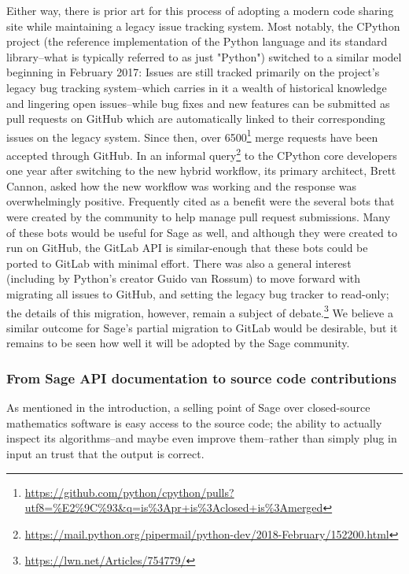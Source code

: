 {

Either way, there is prior art for this process of adopting a modern code
sharing site while maintaining a legacy issue tracking system.  Most notably,
the CPython project (the reference implementation of the Python language and
its standard library--what is typically referred to as just "Python") switched
to a similar model beginning in February 2017: Issues are still tracked
primarily on the project's legacy bug tracking system--which carries in it a
wealth of historical knowledge and lingering open issues--while bug fixes and
new features can be submitted as pull requests on GitHub which are
automatically linked to their corresponding issues on the legacy system.  Since
then, over
6500\footnote{\url{https://github.com/python/cpython/pulls?utf8=\%E2\%9C\%93\&q=is\%3Apr+is\%3Aclosed+is\%3Amerged}}
merge requests have been accepted through GitHub.  In an informal
query\footnote{\url{https://mail.python.org/pipermail/python-dev/2018-February/152200.html}}
to the CPython core developers one year after switching to the new hybrid
workflow, its primary architect, Brett Cannon, asked how the new workflow was
working and the response was overwhelmingly positive.  Frequently cited as a
benefit were the several bots that were created by the community to help manage
pull request submissions.  Many of these bots would be useful for Sage as well,
and although they were created to run on GitHub, the GitLab API is
similar-enough that these bots could be ported to GitLab with minimal effort.
There was also a general interest (including by Python's creator Guido van
Rossum) to move forward with migrating all issues to GitHub, and setting the
legacy bug tracker to read-only; the details of this migration, however, remain
a subject of debate.\footnote{\url{https://lwn.net/Articles/754779/}}  We
believe a similar outcome for Sage's partial migration to GitLab would be
desirable, but it remains to be seen how well it will be adopted by the Sage
community.


\hypertarget{source-in-documentation}{%
\subsubsection{From Sage API documentation to source code contributions}\label{source-in-documentation}}

As mentioned in the introduction, a selling point of Sage over closed-source
mathematics software is easy access to the source code; the ability to actually
inspect its algorithms--and maybe even improve them--rather than simply plug in
input an trust that the output is correct.

}
